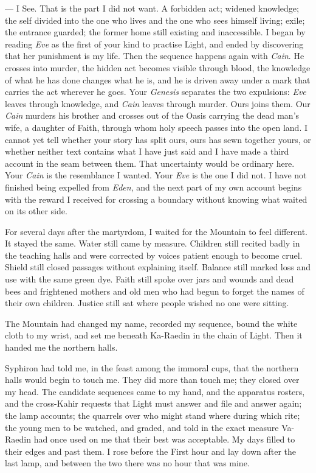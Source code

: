 \begin{room}
--- I See. That is the part I did not want. A forbidden act; widened knowledge; the self divided into the one who lives and the one who sees himself living; exile; the entrance guarded; the former home still existing and inaccessible. I began by reading \textit{Eve} as the first of your kind to practise Light, and ended by discovering that her punishment is my life. Then the sequence happens again with \textit{Cain}. He crosses into murder, the hidden act becomes visible through blood, the knowledge of what he has done changes what he is, and he is driven away under a mark that carries the act wherever he goes. Your \textit{Genesis} separates the two expulsions: \textit{Eve} leaves through knowledge, and \textit{Cain} leaves through murder. Ours joins them. Our \textit{Cain} murders his brother and crosses out of the Oasis carrying the dead man's wife, a daughter of Faith, through whom holy speech passes into the open land. I cannot yet tell whether your story has split ours, ours has sewn together yours, or whether neither text contains what I have just said and I have made a third account in the seam between them. That uncertainty would be ordinary here. Your \textit{Cain} is the resemblance I wanted. Your \textit{Eve} is the one I did not. I have not finished being expelled from \textit{Eden}, and the next part of my own account begins with the reward I received for crossing a boundary without knowing what waited on its other side.

\end{room}

For several days after the martyrdom, I waited for the Mountain to feel different. It stayed the same. Water still came by measure. Children still recited badly in the teaching halls and were corrected by voices patient enough to become cruel. Shield still closed passages without explaining itself. Balance still marked loss and use with the same green dye. Faith still spoke over jars and wounds and dead bees and frightened mothers and old men who had begun to forget the names of their own children. Justice still sat where people wished no one were sitting.\par

The Mountain had changed my name, recorded my sequence, bound the white cloth to my wrist, and set me beneath Ka-Raedin in the chain of Light. Then it handed me the northern halls.\par

Syphiron had told me, in the feast among the immoral cups, that the northern halls would begin to touch me. They did more than touch me; they closed over my head. The candidate sequences came to my hand, and the apparatus rosters, and the cross-Kahir requests that Light must answer and file and answer again; the lamp accounts; the quarrels over who might stand where during which rite; the young men to be watched, and graded, and told in the exact measure Va-Raedin had once used on me that their best was acceptable. My days filled to their edges and past them. I rose before the First hour and lay down after the last lamp, and between the two there was no hour that was mine.\par

